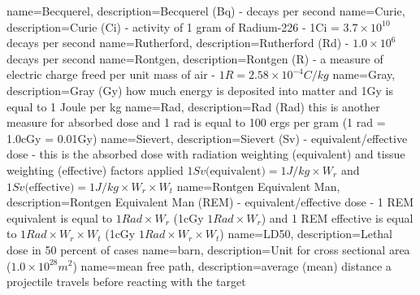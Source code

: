 {
    name=Becquerel,
    description={Becquerel (Bq) - decays per second}
}
{
    name=Curie,
    description={Curie (Ci) - activity of 1 gram of Radium-226 - 1Ci = $3.7 \times 10^{10}$ decays per second}
}
{
    name=Rutherford,
    description={Rutherford (Rd) - $1.0 \times 10^{6}$ decays per second}
}
{
    name=Rontgen,
    description={Rontgen (R) - a measure of electric charge freed per unit mass of air - $1R = 2.58 \times 10^{-4} C/kg$}
}
{
    name=Gray,
    description={Gray (Gy) how much energy is deposited into matter and 1Gy is equal to 1 Joule per kg}
}
{
    name=Rad,
    description={Rad (Rad) this is another measure for absorbed dose and 1 rad is equal to 100 ergs per gram (1 rad = 1.0cGy = 0.01Gy)}
}
{
    name=Sievert,
    description={Sievert (Sv) - equivalent/effective dose - this is the absorbed dose with radiation weighting (equivalent) and tissue weighting (effective) factors applied $1Sv \text{(equivalent)} = 1 J/kg \times W_r$ and $1Sv \text{(effective)} = 1 J/kg \times W_r \times W_t$}
}
{
    name=Rontgen Equivalent Man,
    description={Rontgen Equivalent Man (REM) - equivalent/effective dose - 1 REM equivalent is equal to $1Rad \times W_r$ (1cGy $1Rad \times W_r$) and 1 REM effective is equal to $1Rad \times W_r \times W_t$ (1cGy $1Rad \times W_r \times W_t$)}
}
{
    name=LD50,
    description={Lethal dose in 50 percent of cases}
}
{
    name=barn,
    description={Unit for cross sectional area ($1.0 \times 10^{28} m^{2}$)}
}
{
    name=mean free path,
    description={average (mean) distance a projectile travels before reacting with the target}
}







